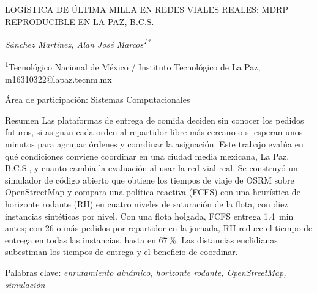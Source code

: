 \documentclass[10pt]{article}
\makeatletter
\newif\ifblind
\renewcommand{\section}{\@startsection{section}{1}{0pt}{8pt}{0.1pt}
  {\semibold\fontsize{12}{14.6}\selectfont\color{riimazul}\raggedright}}
\makeatother
\begin{document}
\begin{center}
  \setlength{\parskip}{0pt}
  \vspace*{6pt}
  {\semibold\fontsize{16}{19.5}\selectfont{}%
   LOGÍSTICA DE ÚLTIMA MILLA EN REDES VIALES REALES: MDRP REPRODUCIBLE EN LA PAZ, B.C.S.\par}
  \vspace{18pt}
  \ifblind\else
  {\itshape\fontsize{9}{11}\selectfont
   Sánchez Martínez, Alan José Marcos\textsuperscript{1*}\par
   \textsuperscript{1}Tecnológico Nacional de México / Instituto Tecnológico de La Paz, m16310322@lapaz.tecnm.mx\par}
  \fi
  {\fontsize{9}{11}\selectfont Área de participación: Sistemas Computacionales\par}
\end{center}

\section{Resumen}
Las plataformas de entrega de comida deciden sin conocer los pedidos futuros, si asignan cada orden
al repartidor libre más cercano o si esperan unos minutos para agrupar órdenes y coordinar la
asignación. Este trabajo evalúa en qué condiciones conviene coordinar en una ciudad media mexicana,
La Paz, B.C.S., y cuanto cambia la evaluación al usar la red vial real. Se construyó un simulador de
código abierto que obtiene los tiempos de viaje de OSRM sobre OpenStreetMap y compara una política
reactiva (FCFS) con una heurística de horizonte rodante (RH) en cuatro niveles de saturación de la
flota, con diez instancias sintéticas por nivel. Con una flota holgada, FCFS entrega 1.4~min antes;
con 26 o más pedidos por repartidor en la jornada, RH reduce el tiempo de entrega en todas las
instancias, hasta en 67\,\%. Las distancias euclidianas subestiman los tiempos de entrega y el
beneficio de coordinar.

{\semibold\fontsize{12}{14.6}\selectfont\color{riimazul}Palabras clave}: \textit{enrutamiento dinámico, horizonte rodante, OpenStreetMap, simulación}
\end{document}
